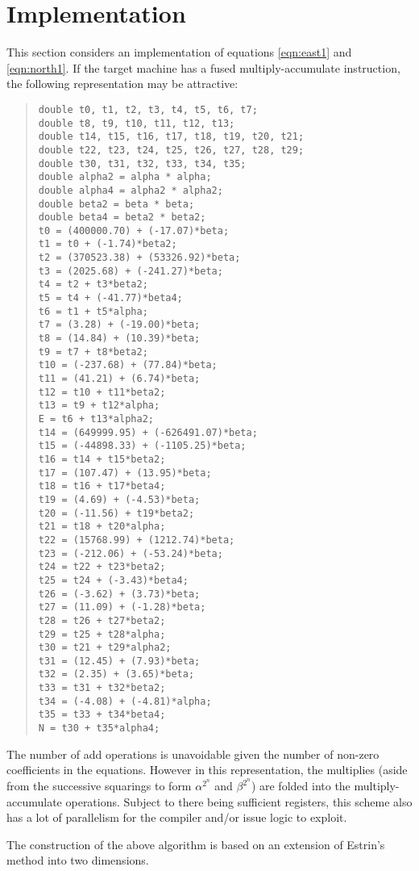 \documentclass[10pt,a4paper]{article}
\begin{document}
\section {Implementation}
This section considers an implementation of equations \eqref{eqn:east1} and
\eqref{eqn:north1}.  If the target machine has a fused multiply-accumulate
instruction, the following representation may be attractive:
\begin{quote}
\small
\begin{verbatim}
double t0, t1, t2, t3, t4, t5, t6, t7;
double t8, t9, t10, t11, t12, t13;
double t14, t15, t16, t17, t18, t19, t20, t21;
double t22, t23, t24, t25, t26, t27, t28, t29;
double t30, t31, t32, t33, t34, t35;
double alpha2 = alpha * alpha;
double alpha4 = alpha2 * alpha2;
double beta2 = beta * beta;
double beta4 = beta2 * beta2;
t0 = (400000.70) + (-17.07)*beta;
t1 = t0 + (-1.74)*beta2;
t2 = (370523.38) + (53326.92)*beta;
t3 = (2025.68) + (-241.27)*beta;
t4 = t2 + t3*beta2;
t5 = t4 + (-41.77)*beta4;
t6 = t1 + t5*alpha;
t7 = (3.28) + (-19.00)*beta;
t8 = (14.84) + (10.39)*beta;
t9 = t7 + t8*beta2;
t10 = (-237.68) + (77.84)*beta;
t11 = (41.21) + (6.74)*beta;
t12 = t10 + t11*beta2;
t13 = t9 + t12*alpha;
E = t6 + t13*alpha2;
t14 = (649999.95) + (-626491.07)*beta;
t15 = (-44898.33) + (-1105.25)*beta;
t16 = t14 + t15*beta2;
t17 = (107.47) + (13.95)*beta;
t18 = t16 + t17*beta4;
t19 = (4.69) + (-4.53)*beta;
t20 = (-11.56) + t19*beta2;
t21 = t18 + t20*alpha;
t22 = (15768.99) + (1212.74)*beta;
t23 = (-212.06) + (-53.24)*beta;
t24 = t22 + t23*beta2;
t25 = t24 + (-3.43)*beta4;
t26 = (-3.62) + (3.73)*beta;
t27 = (11.09) + (-1.28)*beta;
t28 = t26 + t27*beta2;
t29 = t25 + t28*alpha;
t30 = t21 + t29*alpha2;
t31 = (12.45) + (7.93)*beta;
t32 = (2.35) + (3.65)*beta;
t33 = t31 + t32*beta2;
t34 = (-4.08) + (-4.81)*alpha;
t35 = t33 + t34*beta4;
N = t30 + t35*alpha4;
\end{verbatim}
\end{quote}

The number of add operations is unavoidable given the number of non-zero
coefficients in the equations.  However in this representation, the multiplies
(aside from the successive squarings to form $\alpha^{2^n}$ and $\beta^{2^n}$) are
folded into the multiply-accumulate operations.  Subject to there being
sufficient registers, this scheme also has a lot of parallelism for the
compiler and/or issue logic to exploit.

The construction of the above algorithm is based on an extension of Estrin's
method \cite{estrin} into two dimensions.
\end{document}
